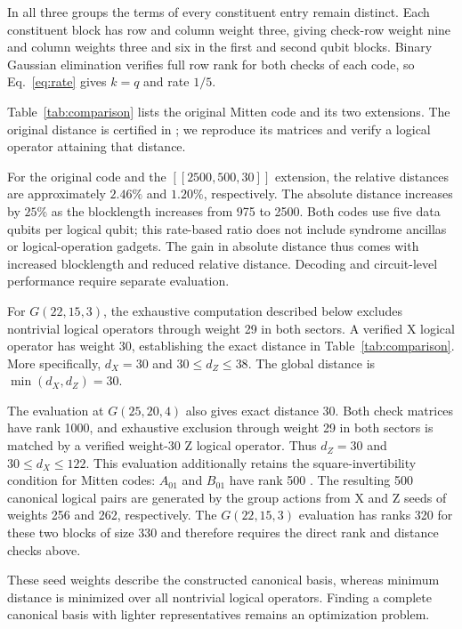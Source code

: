 \documentclass[12pt]{article}
\begin{document}
In all three groups the terms of every constituent entry remain distinct.
Each constituent block has row and column weight three, giving check-row
weight nine and column weights three and six in the first and second
qubit blocks. Binary Gaussian elimination verifies full row rank for both
checks of each code, so Eq.~\eqref{eq:rate} gives $k=q$ and rate $1/5$.

Table~\ref{tab:comparison} lists the
original Mitten code and its two extensions. The original distance is certified
in \cite[Appendix C]{qedist}; we reproduce its matrices and verify a
logical operator attaining that distance.


For the original code and the $[[2500,500,30]]$ extension, the relative
distances are approximately $2.46\%$ and $1.20\%$, respectively.
The absolute distance increases by $25\%$ as the blocklength increases
from 975 to 2500. Both codes use five data qubits per logical qubit;
this rate-based ratio does not include syndrome ancillas or logical-operation
gadgets. The gain in absolute distance thus comes with increased
blocklength and reduced relative distance. Decoding and circuit-level
performance require separate evaluation.

For $G(22,15,3)$, the exhaustive computation described below excludes nontrivial logical
operators through weight 29 in both sectors. A verified X logical operator
has weight 30, establishing the exact distance in
Table~\ref{tab:comparison}. More specifically, $d_X=30$ and
$30\leq d_Z\leq38$. The global distance is $\min(d_X,d_Z)=30$.

The evaluation at $G(25,20,4)$ also gives exact distance 30.
Both check matrices have rank 1000, and exhaustive exclusion through
weight 29 in both sectors is matched by a verified weight-30 Z logical
operator. Thus $d_Z=30$ and $30\leq d_X\leq122$.
This evaluation additionally retains the square-invertibility condition
for Mitten codes: $A_{01}$ and $B_{01}$ have rank 500
\cite[Definition~4 and Theorem~1]{mitten}.
The resulting 500 canonical logical pairs are generated by the group
actions from X and Z seeds of weights 256 and 262, respectively.
The $G(22,15,3)$ evaluation has ranks 320 for these two blocks of size
330 and therefore requires the direct rank and distance checks above.

These seed weights describe the constructed canonical basis, whereas
minimum distance is minimized over all nontrivial logical operators.
Finding a complete canonical basis with lighter representatives remains
an optimization problem.
\end{document}
